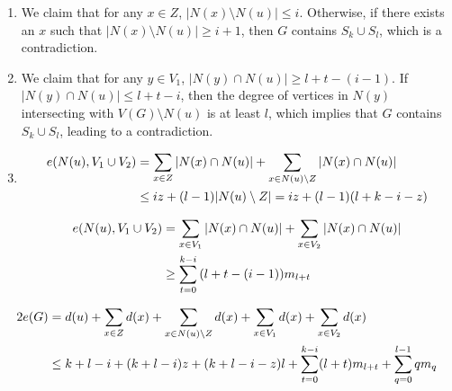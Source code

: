 \documentclass[12pt]{elsarticle}
\begin{document}


\begin{enumerate}[label=(\alph*)]
    \item We claim that for any $x \in Z$, $|N(x) \setminus N(u)| \le i$. Otherwise, if there exists an $x$ such that $|N(x) \setminus N(u)| \ge i + 1$, then $G$ contains $S_k \cup S_l$, which is a contradiction.
    
    \item We claim that for any $y \in V_1$, $|N(y) \cap N(u)| \ge l + t - (i - 1)$. If $|N(y) \cap N(u)| \le l + t - i$, then the degree of vertices in $N(y)$ intersecting with $V(G) \setminus N(u)$ is at least $l$, which implies that $G$ contains $S_k \cup S_l$, leading to a contradiction.
    
    \item 
    \begin{align}
        e(N(u), V_1 \cup V_2) &= \sum_{x\in Z} |N(x) \cap N(u)| + \sum_{x\in N(u)\setminus Z} |N(x) \cap N(u)| \notag \\ 
        &\le iz + (l - 1)|N(u) \setminus Z| = iz + (l - 1)(l + k - i - z) \notag
    \end{align}
    
    \begin{small}
    \begin{align}
    e(N(u), V_1 \cup V_2) &= \sum_{x\in V_1}{|N(x) \cap N(u)|} + \sum_{x\in V_2}{|N(x) \cap N(u)|} \notag \\
    &\ge \sum_{t=0}^{k-i}{(l + t - (i - 1)) m_{l + t}} \notag
    \end{align}
    \end{small}
\end{enumerate}


\begin{small}
    \begin{align}
    2e(G) &= d(u) + \sum_{x \in Z} d(x) + \sum_{x \in N(u) \setminus Z} d(x) + \sum_{x \in V_1} d(x) + \sum_{x \in V_2} d(x) \notag \\
    &\le k + l - i + (k + l - i)z + (k + l - i - z)l + \sum_{t=0}^{k-i}(l + t)m_{l+t} + \sum_{q=0}^{l-1}qm_{q} \notag
    \end{align}
    \end{small}
    
\end{document}

